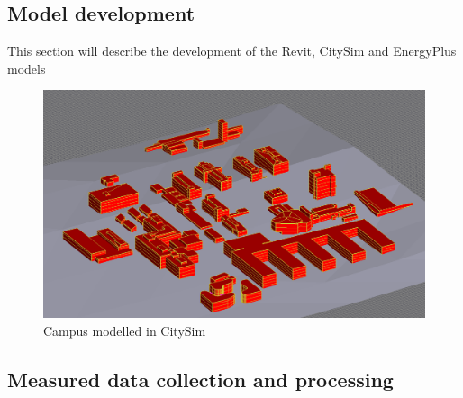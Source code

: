 \documentclass{tBPS2e}
\theoremstyle{plain}
\theoremstyle{definition}
\theoremstyle{remark}
\begin{document}
\subsection{Model development}
{\color{red}This section will describe the development of the Revit, CitySim and EnergyPlus models}
\begin{figure}
\centering
\includegraphics[scale=0.3]{figures/campuscitysim}
\caption{Campus modelled in CitySim}
\label{fig:campuscitysim}
\end{figure}

\subsection{Measured data collection and processing}
\end{document}
